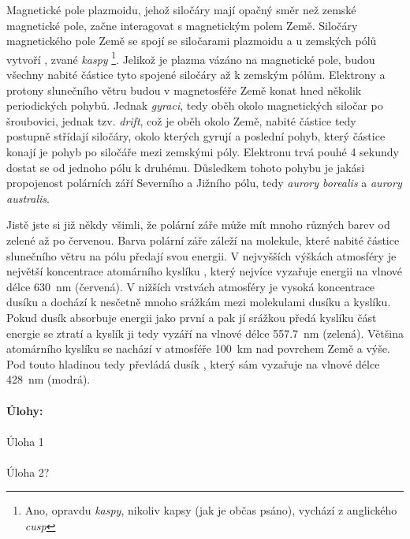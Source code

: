 \documentclass{../../../../style/mkimain}
\begin{document}
Magnetické pole plazmoidu, jehož siločáry mají opačný směr než zemské magnetické pole, začne 
interagovat s magnetickým polem Země. Siločáry magnetického pole Země se spojí se siločarami plazmoidu 
a u zemských pólů vytvoří , zvané \emph{kaspy} \footnote[2]{Ano, opravdu \emph{kaspy}, 
nikoliv kapsy (jak je občas psáno), vychází z anglického \emph{cusp}}. Jelikož je plazma vázáno na magnetické pole, 
budou všechny nabité částice  tyto spojené siločáry až k zemským pólům. Elektrony 
a protony slunečního větru budou v magnetosféře Země konat hned několik periodických pohybů.
Jednak \emph{gyraci}, tedy oběh okolo magnetických siločar po šroubovici, jednak tzv. \emph{drift}, 
což je oběh okolo Země, nabité částice tedy postupně střídají siločáry, okolo kterých gyrují a 
poslední pohyb, který částice konají je pohyb po siločáře mezi zemskými póly. Elektronu trvá 
pouhé 4 sekundy dostat se od jednoho pólu k druhému. Důsledkem tohoto pohybu je jakási 
propojenost polárních září Severního a Jižního pólu, tedy \emph{aurory borealis} a \emph{aurory australis}.

Jistě jste si již někdy všimli, že polární záře může mít mnoho různých barev od zelené až 
po červenou. Barva polární záře záleží na molekule, které nabité částice slunečního větru 
na pólu předají svou energii. V nejvyšších výškách atmosféry je největší koncentrace atomárního 
kyslíku , který nejvíce vyzařuje energii na vlnové délce \qty{630}{\nm} (červená). V nižších 
vrstvách atmosféry je vysoká koncentrace dusíku  a dochází k nesčetně mnoho srážkám mezi 
molekulami dusíku a kyslíku. Pokud dusík absorbuje energii jako první a pak jí srážkou předá 
kyslíku část energie se ztratí a kyslík ji tedy vyzáří na vlnové délce \qty{557.7}{\nm} (zelená).
Většina atomárního kyslíku se nachází v atmosféře \qty{100}{\km} nad povrchem Země a výše. Pod 
touto hladinou tedy převládá dusík , který sám vyzařuje na vlnové délce \qty{428}{\nm} (modrá).
\\
\\
\textbf{Úlohy:}
\\
\\
Úloha 1
\\
\\
Úloha 2?
\end{document}
